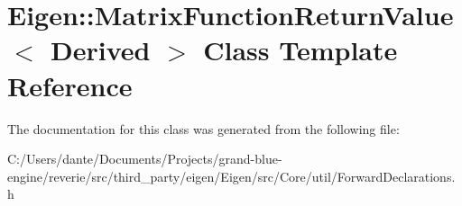 \hypertarget{class_eigen_1_1_matrix_function_return_value}{}\section{Eigen\+::Matrix\+Function\+Return\+Value$<$ Derived $>$ Class Template Reference}
\label{class_eigen_1_1_matrix_function_return_value}


The documentation for this class was generated from the following file\+:\begin{DoxyCompactItemize}
\item 
C\+:/\+Users/dante/\+Documents/\+Projects/grand-\/blue-\/engine/reverie/src/third\+\_\+party/eigen/\+Eigen/src/\+Core/util/Forward\+Declarations.\+h\end{DoxyCompactItemize}
